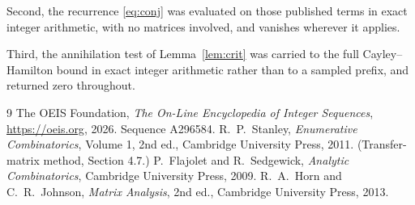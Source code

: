 \documentclass[11pt,a4paper]{article}
\theoremstyle{plain}
\theoremstyle{definition}
\begin{document}
Second, the recurrence \eqref{eq:conj} was evaluated on those published terms in exact
integer arithmetic, with no matrices involved, and vanishes wherever it applies.

Third, the annihilation test of Lemma~\ref{lem:crit} was carried to the full
Cayley--Hamilton bound in exact integer arithmetic rather than to a sampled prefix, and
returned zero throughout.

\begin{thebibliography}{9}
 The OEIS Foundation, \emph{The On-Line Encyclopedia of Integer
Sequences}, \url{https://oeis.org}, 2026. Sequence A296584.
 R.~P.~Stanley, \emph{Enumerative Combinatorics}, Volume 1, 2nd ed.,
Cambridge University Press, 2011. (Transfer-matrix method, Section 4.7.)
 P.~Flajolet and R.~Sedgewick, \emph{Analytic Combinatorics}, Cambridge
University Press, 2009.
 R.~A.~Horn and C.~R.~Johnson, \emph{Matrix Analysis}, 2nd ed., Cambridge
University Press, 2013.
\end{thebibliography}
\end{document}
